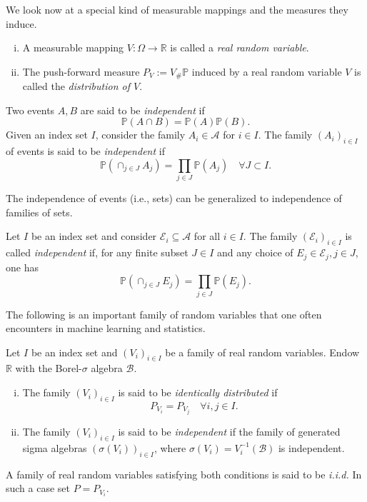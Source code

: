 We look now at a special kind of measurable mappings and the measures they induce.
\begin{definition}
	\label{def:RV}
	\begin{enumerate}[(i)] Let $(\Omega,\mathcal{A}, \mathbb{P})$ be a probability measure space.
		\item A measurable mapping $V: \Omega \to \mathbb{R}$ is called a \emph{real random variable}.
		\item The push-forward measure $P_V := V_\# \mathbb{P}$ induced by a real random variable $V$ 
		is called the \emph{distribution of $V$}.		
	\end{enumerate}
\end{definition}


\begin{definition}
Two events $A,B$ are said to be \emph{independent} if $$\mathbb{P}(A \cap B) = \mathbb{P}(A)\mathbb{P}(B).$$ Given 
an index set $I$, consider the family $A_i \in \mathcal{A}$ for $i \in I$. The
family $(A_i)_{i\in I}$ of events is said to be \emph{independent}
if $$\mathbb{P}(\cap_{j \in J} A_j) = \prod_{j \in J} \mathbb{P}(A_j) \quad \forall J \subset I.$$	
\end{definition}

The independence of events (i.e., sets) can be generalized to independence of
families of sets. 
\begin{definition}
        Let $I$ be an index set and consider $\mathcal{E}_i \subseteq \mathcal{A}$ for all $i \in I$.
        The family $(\mathcal{E}_i)_{i \in I}$ is called \emph{independent} if, for any finite subset 
        $J \in I$ and any choice of $E_j \in \mathcal{E}_j, j \in J$, one has 
        $$
        \mathbb{P}(\cap_{j \in J} E_j) = \prod_{j \in J} \mathbb{P}(E_j).
        $$
\end{definition}
The following is an important family of random variables that one often encounters 
in machine learning and statistics. 
\begin{definition}
	\label{def:iid}
	Let $I$ be an index set and $(V_i)_{i \in I}$ be a family of real random 
	variables. Endow $\mathbb{R}$ with the Borel-$\sigma$ algebra $\mathcal{B}$.
	\begin{enumerate}[(i)]
		\item The family $(V_i)_{i \in I}$ is said to be \emph{identically distributed} if 
		$$P_{V_i} = P_{V_j} \quad \forall i, j \in I.$$
		\item The family $(V_i)_{i \in I}$ is said to be \emph{independent} if the 
		family of generated sigma algebras $(\sigma(V_i))_{i\in I}$, where 
		$\sigma(V_i) = V_i^{-1}(\mathcal{B})$ is independent.
	\end{enumerate}
A family of real random variables satisfying both conditions is said to be \emph{i.i.d.}
In such a case set $P = P_{V_i}$. \end{definition}

